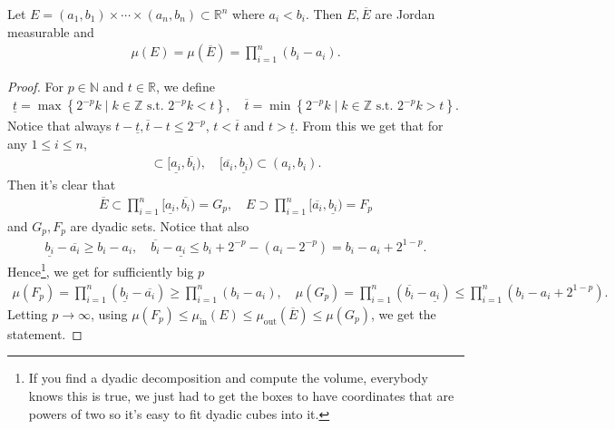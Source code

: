 

\begin{lemma}\label{lem:box-volume}
    Let $E = (a_{1}, b_{1}) \times \cdots \times (a_{n}, b_{n}) \subset \mathbb{R}^{n}$ where $a_{i} < b_{i}$. Then $E, \overline{ E } $ are Jordan measurable and 
    \begin{align*}
        \mu(E) = \mu(\overline{ E } ) = \prod_{i=1}^{n}(b_{i} - a_{i}).
    \end{align*}
\end{lemma}
\begin{proof}
    For $p \in \mathbb{N}$ and $t \in \mathbb{R}$, we define
    \begin{align*}
        \underline{t} = \max \left\{ 2^{-p}k \mid k \in \mathbb{Z} \text{ s.t. } 2^{-p}k < t \right\}, \quad \overline{ t }  = \min \left\{ 2^{-p}k \mid k \in \mathbb{Z} \text{ s.t. } 2^{-p}k > t \right\}.
    \end{align*}
    Notice that always $t - \underline{t}, \overline{ t } - t \leq 2^{-p}$, $t < \overline{ t } $ and $t > \underline{t}$. From this we get that for any $1 \leq i \leq n$,
    \begin{align*}
        [a_{i}, b_{i}] \subset [\underline{a_{i}}, \overline{ b_{i} }), \quad [\overline{ a_{i} }, \underline{b_{i}} ) \subset (a_{i}, b_{i}).
    \end{align*}
    Then it's clear that
    \begin{align*}
        \overline{ E } \subset \prod_{i=1}^{n} [\underline{a_{i}}, \overline{ b_{i} } ) = G_{p}, \quad E \supset \prod_{i=1}^{n} [ \overline{ a_{i} }, \underline{b_{i}} ) = F_{p}
    \end{align*}
    and $G_{p}, F_{p}$ are dyadic sets. Notice that also
    \begin{align*}
        \underline{b_{i}} - \overline{ a_{i} }  \geq b_{i} - a_{i}, \quad \overline{ b_{i} } - \underline{a_{i}} \leq b_{i} + 2^{-p} - (a_{i} - 2^{-p}) = b_{i} - a_{i} + 2^{1-p}. 
    \end{align*}
    Hence\footnote{If you find a dyadic decomposition and compute the volume, everybody knows this is true, we just had to get the boxes to have coordinates that are powers of two so it's easy to fit dyadic cubes into it.}, we get for sufficiently big $p$
    \begin{align*}
        \mu(F_{p}) = \prod_{i=1}^{n} ( \underline{ b_{i} } - \overline{ a_{i} }  ) \geq \prod_{i=1}^{n} (b_{i} - a_{i}), \quad \mu(G_{p}) = \prod_{i=1}^{n} ( \overline{ b_{i} } - \underline{ a_{i} }  ) \leq \prod_{i=1}^{n} (b_{i} - a_{i} + 2^{1-p}).
    \end{align*}
    Letting $p \to \infty$, using $\mu(F_{p}) \leq \mu_{\text{in}}(E) \leq \mu_{\text{out}}(\overline{ E } ) \leq \mu(G_{p})$, we get the statement. 
\end{proof}

